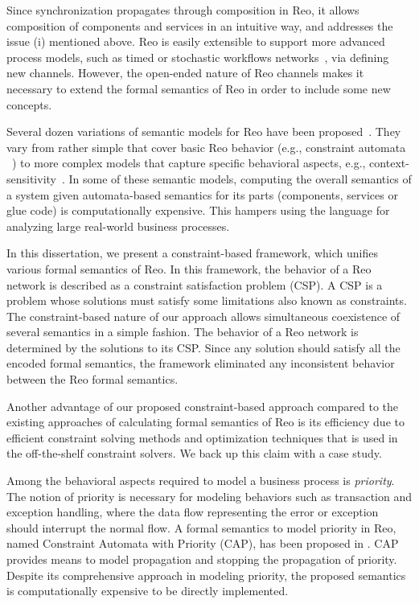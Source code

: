 Since synchronization propagates through composition in Reo, it allows composition of components and services in an intuitive way, and addresses the issue (i) mentioned above. %
Reo is easily extensible to support more advanced process models, such as timed \cite{resMengA07} or stochastic workflows networks~\cite{yjmfolks}, via defining new channels. 
However, the open-ended nature of Reo channels makes it necessary to extend the formal semantics of Reo in order to include some new concepts. 

Several dozen variations of semantic models for Reo have been proposed~\cite{sung30semantics}. They vary from rather simple that cover basic Reo behavior (e.g., constraint automata ~\cite{BaierCA}) to more complex models that capture specific behavioral aspects, e.g., context-sensitivity~\cite{coloring}. In some of these semantic models, computing the overall semantics of a system given automata-based semantics for its parts (components, services or glue code) is computationally expensive. This hampers using the language for analyzing large real-world business processes. 

In this dissertation, we present a constraint-based framework, which unifies various formal semantics of Reo. In this framework, the behavior of a Reo network is described as a constraint satisfaction problem (CSP). A CSP is a problem whose solutions must satisfy some limitations also known as constraints. The constraint-based nature of our approach allows simultaneous coexistence of several semantics in a simple fashion. The behavior of a Reo network is determined by the solutions to its CSP. Since any solution should satisfy all the encoded formal semantics, the framework eliminated any inconsistent behavior between the Reo formal semantics.

Another advantage of our proposed constraint-based approach compared to the existing approaches of calculating formal semantics of Reo is its efficiency due to efficient constraint solving methods and optimization techniques that is used in the off-the-shelf constraint solvers. We back up this claim with a case study.

Among the behavioral aspects required to model a business process is \emph{priority}. The notion of priority is necessary for modeling behaviors such as transaction and exception handling, where the data flow representing the error or exception should interrupt the normal flow. 
A formal semantics to model priority in Reo, named Constraint Automata with Priority (CAP), has been proposed in \cite{priority}. CAP provides means to model propagation and stopping the propagation of priority. Despite its comprehensive approach in modeling priority, the proposed semantics is computationally expensive to be directly implemented. 

